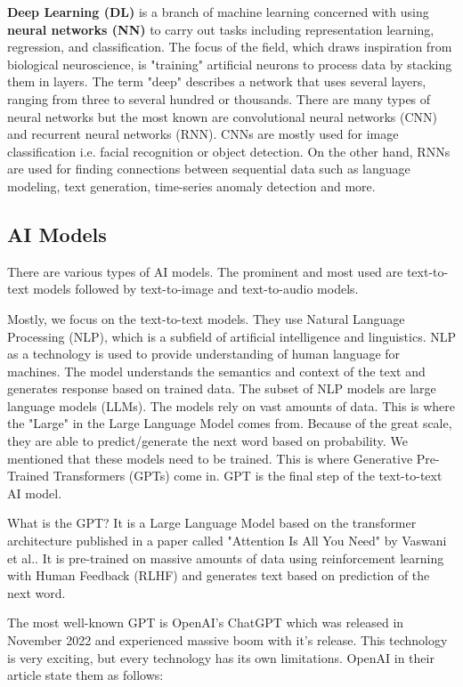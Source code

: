 \textbf{Deep Learning (DL)} is a branch of machine learning concerned with using \textbf{neural networks (NN)} to carry out tasks including representation learning, regression, and classification. The focus of the field, which draws inspiration from biological neuroscience, is "training" artificial neurons to process data by stacking them in layers. The term "deep" describes a network that uses several layers, ranging from three to several hundred or thousands\cite{LeCun2015}. There are many types of neural networks but the most known are convolutional neural networks (CNN) and recurrent neural networks (RNN). CNNs are mostly used for image classification i.e. facial recognition or object detection. On the other hand, RNNs are used for finding connections between sequential data such as language modeling, text generation,  time-series anomaly detection and more.


\subsection{AI Models \label{subsec:AI-Models}}
There are various types of AI models. The prominent and most used are text-to-text models followed by text-to-image and text-to-audio models. 

Mostly, we focus on the text-to-text models. They use Natural Language Processing (NLP), which is a subfield of artificial intelligence and linguistics. NLP as a technology is used to provide understanding of human language for machines. The model understands the semantics and context of the text and generates response based on trained data. The subset of NLP models are large language models (LLMs). The models rely on vast amounts of data. This is where the "Large" in the Large Language Model comes from. Because of the great scale, they are able to predict/generate the next word based on probability. We mentioned that these models need to be trained. This is where Generative Pre-Trained Transformers (GPTs) come in. GPT is the final step of the text-to-text AI model. 

What is the GPT? It is a Large Language Model based on the transformer architecture published in a paper called "Attention Is All You Need" by Vaswani et al.\cite{vaswani2023attentionneed}. It is pre-trained on massive amounts of data using reinforcement learning with Human Feedback (RLHF) \cite{openai_chatgpt_page} and generates text based on prediction of the next word.

The most well-known GPT is OpenAI's ChatGPT which was released in November 2022 and experienced massive boom with it's release. This technology is very exciting, but every technology has its own limitations. OpenAI in their article \cite{openai_chatgpt_page} state them as follows:

